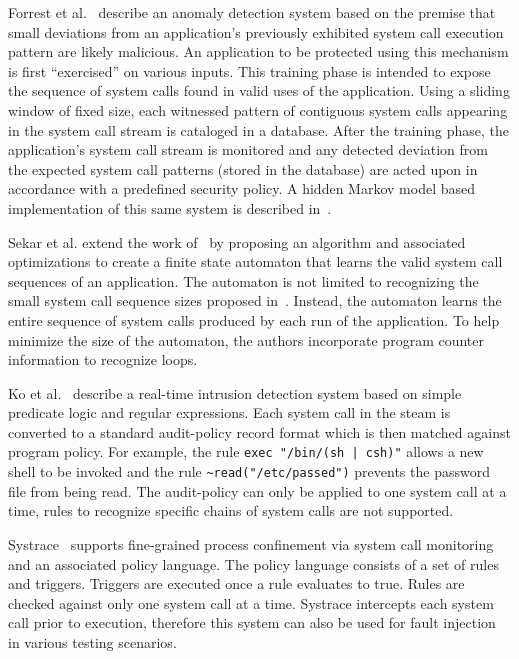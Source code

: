 Forrest et al.~\cite{DBLP:conf/sp/ForrestHSL96} describe
an anomaly detection system based on the premise that small deviations from
an application's previously exhibited system call execution pattern are likely
malicious. An application to be protected using this mechanism is first
``exercised'' on various inputs. This training phase is intended to expose the
sequence of system calls found in valid uses of the application.
Using a sliding
window of fixed size, 
each witnessed pattern of contiguous system calls appearing in the system call stream is cataloged in a database. After the
training phase, the application's system call stream
is monitored and any detected
deviation from the expected system call patterns (stored in the database) are
acted upon in accordance with a predefined security policy.
A hidden Markov model
based implementation of this same system
is described in~\cite{DBLP:conf/sp/WarrenderFP99}.

Sekar et al.\cite{DBLP:conf/sp/SekarBDB01} extend the work of~\cite{DBLP:conf/sp/ForrestHSL96} by proposing an algorithm and associated optimizations to create a finite state automaton that learns the valid system call sequences of an application.
The automaton is not limited to recognizing the small system call sequence sizes proposed in~\cite{DBLP:conf/sp/ForrestHSL96}.
Instead, the automaton learns the entire sequence of system calls produced by each run of the application.
To help minimize the size of the automaton, the authors incorporate program counter information to recognize loops.

Ko et al.~\cite{DBLP:conf/acsac/KoFL94} describe a real-time intrusion detection system
based on simple predicate logic and regular expressions. Each system call in the
steam is converted to a standard audit-policy record format which is then
matched against program policy. For example, the rule \lstinline+exec "/bin/(sh | csh)"+
allows a new shell to be invoked and the rule \lstinline+~read("/etc/passed")+ prevents the
password file from being read. The audit-policy can only be applied to one
system call at a time, rules to recognize specific chains of system calls are
not supported.

Systrace~\cite{DBLP:conf/uss/Provos03} supports fine-grained process confinement via system call monitoring and an associated policy language.
The policy language consists of a set of rules and triggers.
Triggers are executed once a rule evaluates to true. Rules are checked against only one system call at a time.
Systrace intercepts each system call prior to execution, therefore this system can also be used for fault injection in various testing scenarios.

